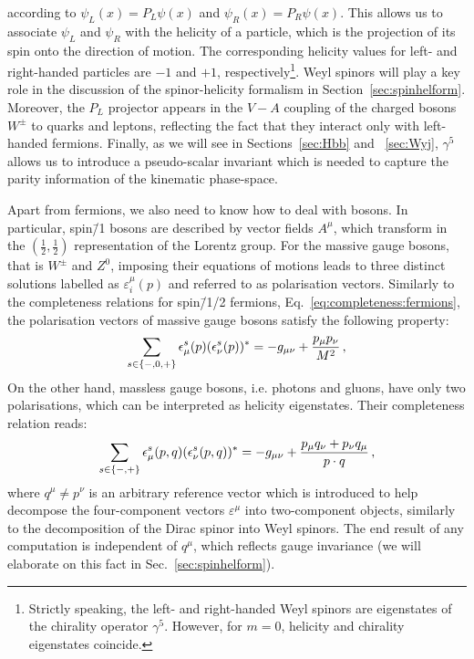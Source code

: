 \documentclass[main.tex]{subfiles}
\begin{document}
according to $\psi_L(x) = P_L\psi(x)$ and $\psi_R(x) = P_R\psi(x)$. This allows us to associate $\psi_L$ and $\psi_R$ with the helicity of a particle, which is the projection of its spin onto the direction of motion. The corresponding helicity values for left- and right-handed particles are $-1$ and $+1$, respectively\footnote{Strictly speaking, the left- and right-handed Weyl spinors are eigenstates of the chirality operator $\gamma^5$. However, for $m=0$, helicity and chirality eigenstates coincide.}. Weyl spinors will play a key role in the discussion of the spinor-helicity formalism in Section~\ref{sec:spinhelform}. Moreover, the $P_L$ projector appears in the $V-A$ coupling of the charged bosons $W^\pm$ to quarks and leptons, reflecting the fact that they interact only with left-handed fermions. Finally, as we will see in Sections~\ref{sec:Hbb} and ~\ref{sec:Wyj}, $\gamma^5$ allows us to introduce a pseudo-scalar invariant which is needed to capture the parity information of the kinematic phase-space. 

Apart from fermions, we also need to know how to deal with bosons. In particular, spin\=/1 bosons are described by vector fields $A^\mu$, which transform in the $(\frac{1}{2}, \frac{1}{2})$ representation of the Lorentz group. For the massive gauge bosons, that is $W^\pm$ and $Z^0$, imposing their equations of motions leads to three distinct solutions labelled as $\varepsilon^\mu_i(p)$ and referred to as polarisation vectors.
Similarly to the completeness relations for spin\=/1/2 fermions, Eq.~\ref{eq:completeness:fermions}, the polarisation vectors of massive gauge bosons satisfy the following property:
\begin{equation}
    \sum_{s \in \{-,0,+\}} \epsilon_\mu^s(p) (\epsilon_\nu^s(p))^{\ast} = -g_{\mu\nu} + \frac{p_\mu p_\nu}{M^2} \,,
\end{equation}
On the other hand, massless gauge bosons, i.e. photons and gluons, have only two polarisations, which can be interpreted as helicity eigenstates. Their completeness relation reads:
\begin{equation} \label{eq:completeness:bosons}
    \sum_{s \in \{-,+\}} \epsilon_\mu^s(p, q) (\epsilon_\nu^s(p, q))^{\ast} = -g_{\mu\nu} + \frac{p_\mu q_\nu + p_\nu q_\mu}{p \cdot q} \,,
\end{equation}
where $q^\mu \neq p^\nu$ is an arbitrary reference vector which is introduced to help decompose the four-component vectors $\varepsilon^\mu$ into two-component objects, similarly to the decomposition of the Dirac spinor into Weyl spinors. The end result of any computation is independent of $q^\mu$, which reflects gauge invariance (we will elaborate on this fact in Sec.~\ref{sec:spinhelform}). 
\end{document}
